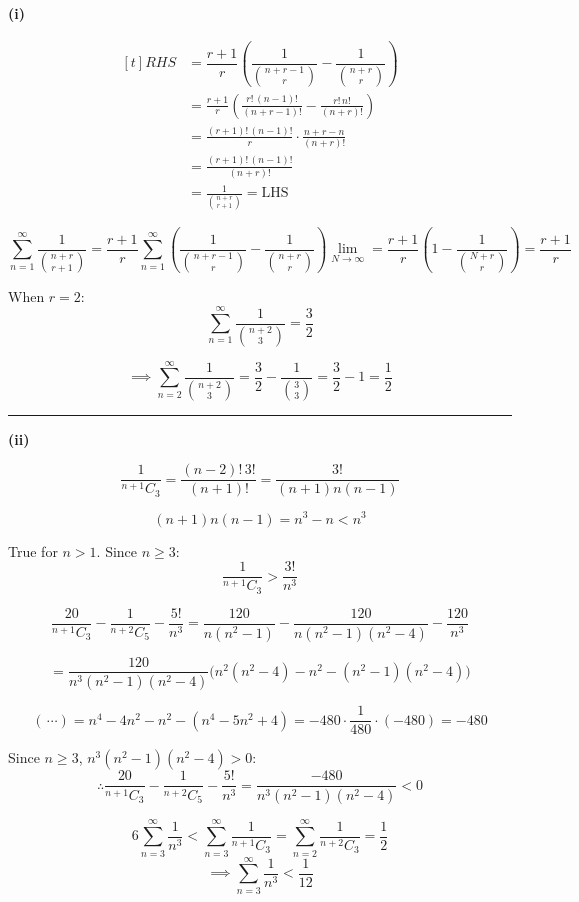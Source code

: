 ﻿\documentclass[12pt]{article}
\begin{document}
\textbf{(i)}


\[
\begin{aligned}[t]
RHS &= \dfrac{r+1}{r}\left(\dfrac{1}{\binom{n+r-1}{r}}-\dfrac{1}{\binom{n+r}{r}}\right)\\
&= \frac{r+1}{r}\left(\frac{r!\,(n-1)!}{(n+r-1)!} - \frac{r!\,n!}{(n+r)!}\right)\\
&= \frac{(r+1)!\,(n-1)!}{r}\cdot\frac{n+r - n}{(n+r)!}\\
&= \frac{(r+1)!\,(n-1)!}{(n+r)!}\\
&= \frac{1}{\binom{n+r}{r+1}} = \text{LHS}
\end{aligned}
\]

\bigskip


\[
\sum_{n=1}^{\infty} \frac{1}{\binom{n+r}{r+1}}
= \frac{r+1}{r}\sum_{n=1}^{\infty}\left(\frac{1}{\binom{n+r-1}{r}}-\frac{1}{\binom{n+r}{r}}\right)
\lim_{N\rightarrow\infty}= \frac{r+1}{r}\left(1 - \frac{1}{\binom{N+r}{r}}\right)=\frac{r+1}{r}
\]


\bigskip

When $r=2$:
\[
\sum_{n=1}^{\infty}\frac{1}{\binom{n+2}{3}} = \frac{3}{2}
\]

\[
\implies\sum_{n=2}^{\infty}\frac{1}{\binom{n+2}{3}} = \frac{3}{2}-\frac{1}{\binom{3}{3}} = \frac{3}{2}-1=\frac{1}{2}
\]

\bigskip\hrule\bigskip
\textbf{(ii)}

$$\dfrac{1}{{}^{n+1}C_3} = \dfrac{(n-2)!\,3!}{(n+1)!} = \dfrac{3!}{(n+1)n(n-1)}$$

\[
(n+1)n(n-1)=n^3-n<n^3
\]

True for $n > 1$. Since $n \geq 3$:
$$\dfrac{1}{{}^{n+1}C_3}>\dfrac{3!}{n^3}$$

\bigskip

\[
\frac{20}{{}^{n+1}C_3} - \frac{1}{{}^{n+2}C_5} - \frac{5!}{n^3}
= \frac{120}{n(n^2-1)} - \frac{120}{n(n^2-1)(n^2-4)} - \frac{120}{n^3}
\]

\[
= \frac{120}{n^3(n^2-1)(n^2-4)}\Big(n^2(n^2-4) - n^2 - (n^2-1)(n^2-4)\Big)
\]

\[
(\,\cdots)=n^4 - 4n^2 - n^2 - (n^4 - 5n^2 + 4) = -480 \cdot \frac{1}{480}\cdot(-480) = -480
\]

Since $n \geq 3$, $n^3(n^2-1)(n^2-4)>0$:
\[
\therefore \frac{20}{{}^{n+1}C_3} - \frac{1}{{}^{n+2}C_5} - \frac{5!}{n^3} = \frac{-480}{n^3(n^2-1)(n^2-4)} < 0
\]


\bigskip

\[
6\sum_{n=3}^{\infty}\frac{1}{n^3} < \sum_{n=3}^{\infty}\frac{1}{{}^{n+1}C_3} = \sum_{n=2}^{\infty}\frac{1}{{}^{n+2}C_3} = \frac{1}{2}
\]
\[
\implies \sum_{n=3}^{\infty}\frac{1}{n^3} < \frac{1}{12}
\]
\end{document}
